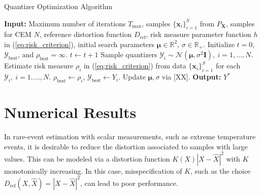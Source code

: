 \documentclass[conference]{IEEEtran}
\begin{document}
\begin{algorithm}
	\caption{Quantizer Optimization Algorithm}\label{alg:optimization}
	\begin{algorithmic}[1]
		\STATE \textbf{Input:} Maximum number of iterations $T_{\max}$, samples  $\{\mathbf{x}_i\}_{i=1}^S$ from $P_{\mathbf{X}}$, samples for CEM $N$, reference distortion function $D_{\mathrm{ref}}$, risk measure parameter function $h$ in (\ref{eq:risk_criterion}), initial search parameters $\boldsymbol{\mu} \in \mathbb{R}^2$, $\sigma \in \mathbb{R}_+$. \STATE Initialize $t = 0$, $\mathcal{Y}_{\mathrm{best}}$, and $\rho_{\mathrm{best}} = \infty$. 
		\STATE $t \leftarrow t+1$
		\STATE Sample quantizers $\mathcal{Y}_i \sim \mathcal{N}(\boldsymbol{\mu},\sigma^2\mathbf{I}),~i = 1,\ldots,N$.
		\STATE Estimate risk measure $\rho_i$ in (\ref{eq:risk_criterion}) from data $\{\mathbf{x}_i\}_{i=1}^S$ for each $\mathcal{Y}_i,~i = 1,\ldots,N$.
		\STATE $\rho_{\mathrm{best}} \leftarrow \rho_i$, $\mathcal{Y}_{\mathrm{best}} \leftarrow Y_i$.
		\ENDIF
		\STATE Update $\boldsymbol{\mu},\sigma$ via [XX].
		\ENDFOR
		\STATE \textbf{Output:} $Y^*$
	\end{algorithmic}
\end{algorithm}

\section{Numerical Results}

In rare-event estimation with scalar measurements, such as extreme temperature events, it is desirable to reduce the distortion associated to samples with large values. This can be modeled via a distortion function $K(X)|X - \hat{X}|^2$ with $K$ monotonically increasing. In this case, misspecification of $K$, such as the choice $D_{\mathrm{ref}}(X,\hat{X}) = |X - \hat{X}|^2$, can lead to poor performance.
\end{document}
